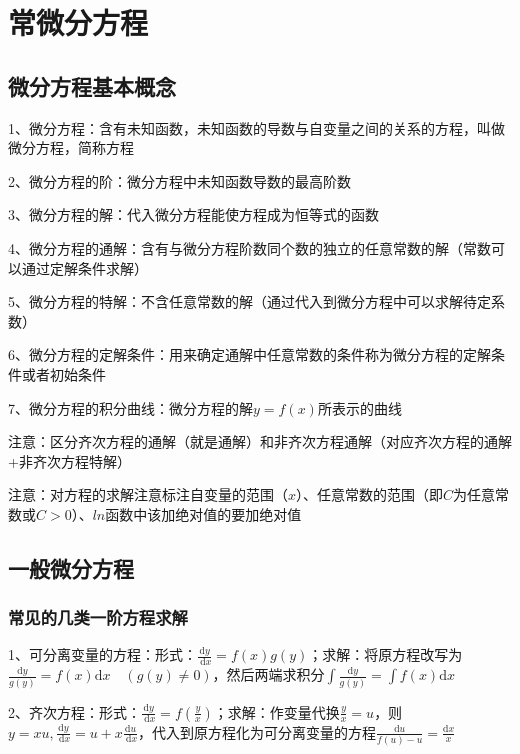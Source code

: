 \chapter{常微分方程}

\section{微分方程基本概念}

1、微分方程：含有未知函数，未知函数的导数与自变量之间的关系的方程，叫做微分方程，简称方程

2、微分方程的阶：微分方程中未知函数导数的最高阶数

3、微分方程的解：代入微分方程能使方程成为恒等式的函数

4、微分方程的通解：含有与微分方程阶数同个数的独立的任意常数的解（常数可以通过定解条件求解）

5、微分方程的特解：不含任意常数的解（通过代入到微分方程中可以求解待定系数）

6、微分方程的定解条件：用来确定通解中任意常数的条件称为微分方程的定解条件或者初始条件

7、微分方程的积分曲线：微分方程的解$y=f(x)$所表示的曲线

注意：区分齐次方程的通解（就是通解）和非齐次方程通解（对应齐次方程的通解+非齐次方程特解）

注意：对方程的求解注意标注自变量的范围（$x$）、任意常数的范围（即$C$为任意常数或$C>0$）、$ln$函数中该加绝对值的要加绝对值

\section{一般微分方程}



\subsection{常见的几类一阶方程求解}

1、可分离变量的方程：形式：$\frac{\mathrm{d} y}{\mathrm{~d} x}=f(x) g(y)$；求解：将原方程改写为$\frac{\mathrm{d} y}{g(y)}=f(x) \mathrm{d} x \quad(g(y) \neq 0)$，然后两端求积分$\int \frac{\mathrm{d} y}{g(y)}=\int f(x) \mathrm{d} x$

2、齐次方程：形式：$\frac{\mathrm{d} y}{\mathrm{~d} x}=f\left(\frac{y}{x}\right)$；求解：作变量代换$\frac{y}{x}=u$，则$y=x u, \frac{\mathrm{d} y}{\mathrm{~d} x}=u+x \frac{\mathrm{d} u}{\mathrm{~d} x}$，代入到原方程化为可分离变量的方程$\frac{\mathrm{d} u}{f(u)-u}=\frac{\mathrm{d} x}{x}$

